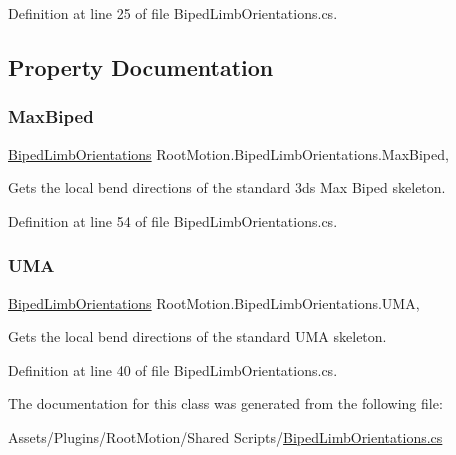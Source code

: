 Definition at line 25 of file Biped\+Limb\+Orientations.\+cs.



\subsection{Property Documentation}
\mbox{\label{class_root_motion_1_1_biped_limb_orientations_af5b7de0727f69656fe170e3852012ac8}} 
\subsubsection{\texorpdfstring{Max\+Biped}{MaxBiped}}
{\footnotesize\ttfamily \mbox{\hyperlink{class_root_motion_1_1_biped_limb_orientations}{Biped\+Limb\+Orientations}} Root\+Motion.\+Biped\+Limb\+Orientations.\+Max\+Biped\hspace{0.3cm}{\ttfamily [static]}, {\ttfamily [get]}}



Gets the local bend directions of the standard 3ds Max Biped skeleton. 



Definition at line 54 of file Biped\+Limb\+Orientations.\+cs.

\mbox{\label{class_root_motion_1_1_biped_limb_orientations_ada203c147babe620801e7fb7e7ddf534}} 
\subsubsection{\texorpdfstring{U\+MA}{UMA}}
{\footnotesize\ttfamily \mbox{\hyperlink{class_root_motion_1_1_biped_limb_orientations}{Biped\+Limb\+Orientations}} Root\+Motion.\+Biped\+Limb\+Orientations.\+U\+MA\hspace{0.3cm}{\ttfamily [static]}, {\ttfamily [get]}}



Gets the local bend directions of the standard U\+MA skeleton. 



Definition at line 40 of file Biped\+Limb\+Orientations.\+cs.



The documentation for this class was generated from the following file\+:\begin{DoxyCompactItemize}
\item 
Assets/\+Plugins/\+Root\+Motion/\+Shared Scripts/\mbox{\hyperlink{_biped_limb_orientations_8cs}{Biped\+Limb\+Orientations.\+cs}}\end{DoxyCompactItemize}
